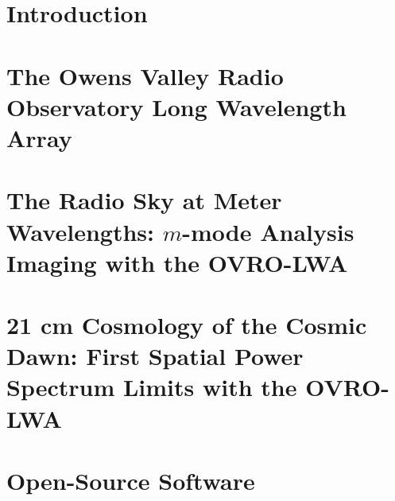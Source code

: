 \documentclass[12pt]{caltech_thesis}
\begin{document}



\tableofcontents
\listoffigures
\listoftables
\printnomenclature

\mainmatter

\chapter{Introduction}

\chapter{The Owens Valley Radio Observatory Long Wavelength Array}

\chapter{The Radio Sky at Meter Wavelengths: $m$-mode Analysis Imaging with the OVRO-LWA}

\chapter{21 cm Cosmology of the Cosmic Dawn: First Spatial Power Spectrum Limits with the OVRO-LWA}

\chapter{Open-Source Software}
\end{document}

